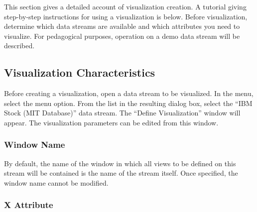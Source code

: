 This section gives a detailed account of visualization creation. A tutorial
giving step-by-step instructions for using a visualization is below. Before
visualization, determine which data streams are available and which attributes
you need to visualize. For pedagogical purposes, operation on a demo data
stream will be described.


\subsection{Visualization Characteristics}

Before creating a visualization, open a data stream to be visualized. In the
 menu, select the  menu option. From the list in the
resulting dialog box, select the ``IBM Stock (MIT Database)'' data stream. The
``Define Visualization'' window will appear. The visualization parameters can be
edited from this window.

\subsubsection{Window Name}

By default, the name of the window in which all views to be defined on this
stream will be contained is the name of the stream itself. Once specified, the
window name cannot be modified.

%
%

\subsubsection{X Attribute}

